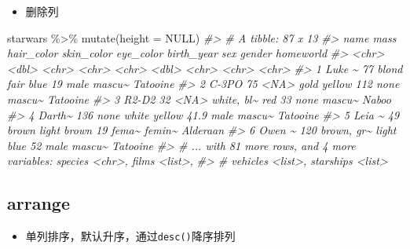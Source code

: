 \documentclass[
]{book}
\newenvironment{Shaded}{\begin{snugshade}}{\end{snugshade}}
\newcommand{\AttributeTok}[1]{\textcolor[rgb]{0.77,0.63,0.00}{#1}}
\newcommand{\CommentTok}[1]{\textcolor[rgb]{0.56,0.35,0.01}{\textit{#1}}}
\newcommand{\ConstantTok}[1]{\textcolor[rgb]{0.00,0.00,0.00}{#1}}
\newcommand{\FunctionTok}[1]{\textcolor[rgb]{0.00,0.00,0.00}{#1}}
\newcommand{\NormalTok}[1]{#1}
\newcommand{\SpecialCharTok}[1]{\textcolor[rgb]{0.00,0.00,0.00}{#1}}
\providecommand{\tightlist}{%
  \setlength{\itemsep}{0pt}\setlength{\parskip}{0pt}}
\begin{document}
\begin{itemize}
\tightlist
\item
  删除列
\end{itemize}

\begin{Shaded}
\begin{Highlighting}[]
\NormalTok{starwars }\SpecialCharTok{\%\textgreater{}\%} \FunctionTok{mutate}\NormalTok{(}\AttributeTok{height =} \ConstantTok{NULL}\NormalTok{)}
\CommentTok{\#\textgreater{} \# A tibble: 87 x 13}
\CommentTok{\#\textgreater{}   name    mass hair\_color skin\_color eye\_color birth\_year sex   gender homeworld}
\CommentTok{\#\textgreater{}   \textless{}chr\textgreater{}  \textless{}dbl\textgreater{} \textless{}chr\textgreater{}      \textless{}chr\textgreater{}      \textless{}chr\textgreater{}          \textless{}dbl\textgreater{} \textless{}chr\textgreater{} \textless{}chr\textgreater{}  \textless{}chr\textgreater{}    }
\CommentTok{\#\textgreater{} 1 Luke \textasciitilde{}    77 blond      fair       blue            19   male  mascu\textasciitilde{} Tatooine }
\CommentTok{\#\textgreater{} 2 C{-}3PO     75 \textless{}NA\textgreater{}       gold       yellow         112   none  mascu\textasciitilde{} Tatooine }
\CommentTok{\#\textgreater{} 3 R2{-}D2     32 \textless{}NA\textgreater{}       white, bl\textasciitilde{} red             33   none  mascu\textasciitilde{} Naboo    }
\CommentTok{\#\textgreater{} 4 Darth\textasciitilde{}   136 none       white      yellow          41.9 male  mascu\textasciitilde{} Tatooine }
\CommentTok{\#\textgreater{} 5 Leia \textasciitilde{}    49 brown      light      brown           19   fema\textasciitilde{} femin\textasciitilde{} Alderaan }
\CommentTok{\#\textgreater{} 6 Owen \textasciitilde{}   120 brown, gr\textasciitilde{} light      blue            52   male  mascu\textasciitilde{} Tatooine }
\CommentTok{\#\textgreater{} \# ... with 81 more rows, and 4 more variables: species \textless{}chr\textgreater{}, films \textless{}list\textgreater{},}
\CommentTok{\#\textgreater{} \#   vehicles \textless{}list\textgreater{}, starships \textless{}list\textgreater{}}
\end{Highlighting}
\end{Shaded}

\hypertarget{dplyr-arrange}{%
\subsection{arrange}\label{dplyr-arrange}}

\begin{itemize}
\tightlist
\item
  单列排序，默认升序，通过\texttt{desc()}降序排列
\end{itemize}
\end{document}
